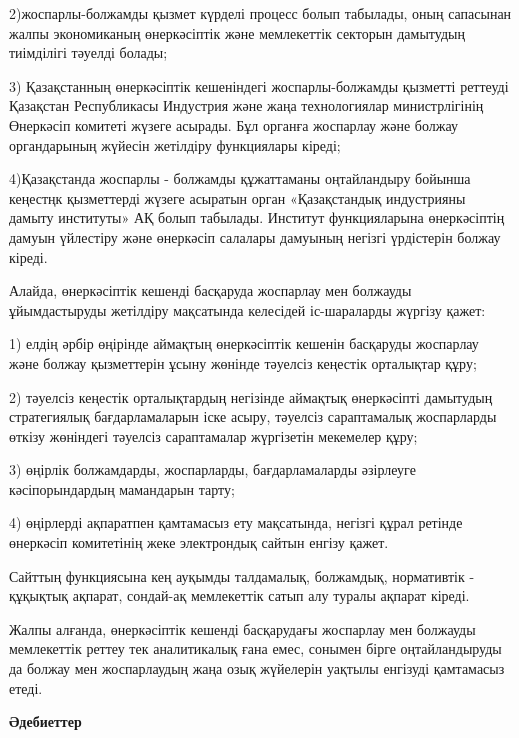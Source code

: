 \begin{multicols}{2}
2)жоспарлы-болжамды қызмет күрделі процесс болып табылады, оның
сапасынан жалпы экономиканың өнеркәсіптік және мемлекеттік секторын
дамытудың тиімділігі тәуелді болады;

3) Қазақстанның өнеркәсіптік кешеніндегі жоспарлы-болжамды қызметті
реттеуді Қазақстан Республикасы Индустрия және жаңа технологиялар
министрлігінің Өнеркәсіп комитеті жүзеге асырады. Бұл органға жоспарлау
және болжау органдарының жүйесін жетілдіру функциялары кіреді;

4)Қазақстанда жоспарлы - болжамды құжаттаманы оңтайландыру бойынша
кеңестңк қызметтерді жүзеге асыратын орган «Қазақстандық индустрияны
дамыту институты» АҚ болып табылады. Институт функцияларына өнеркәсіптің
дамуын үйлестіру және өнеркәсіп салалары дамуының негізгі үрдістерін
болжау кіреді.

Алайда, өнеркәсіптік кешенді басқаруда жоспарлау мен болжауды
ұйымдастыруды жетілдіру мақсатында келесідей іс-шараларды жүргізу қажет:

1) елдің әрбір өңірінде аймақтың өнеркәсіптік кешенін басқаруды
жоспарлау және болжау қызметтерін ұсыну жөнінде тәуелсіз кеңестік
орталықтар құру;

2) тәуелсіз кеңестік орталықтардың негізінде аймақтық өнеркәсіпті
дамытудың стратегиялық бағдарламаларын іске асыру, тәуелсіз сараптамалық
жоспарларды өткізу жөніндегі тәуелсіз сараптамалар жүргізетін мекемелер
құру;

3) өңірлік болжамдарды, жоспарларды, бағдарламаларды әзірлеуге
кәсіпорындардың мамандарын тарту;

4) өңірлерді ақпаратпен қамтамасыз ету мақсатында, негізгі құрал ретінде
өнеркәсіп комитетінің жеке электрондық сайтын енгізу қажет.

Сайттың функциясына кең ауқымды талдамалық, болжамдық, нормативтік -
құқықтық ақпарат, сондай-ақ мемлекеттік сатып алу туралы ақпарат кіреді.

Жалпы алғанда, өнеркәсіптік кешенді басқарудағы жоспарлау мен болжауды
мемлекеттік реттеу тек аналитикалық ғана емес, сонымен бірге
оңтайландыруды да болжау мен жоспарлаудың жаңа озық жүйелерін уақтылы
енгізуді қамтамасыз етеді.
\end{multicols}

\begin{center}
{\bfseries Әдебиеттер}
\end{center}

